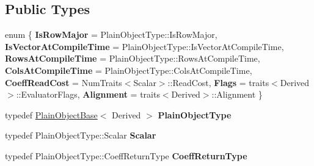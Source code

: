 \subsection*{Public Types}
\begin{DoxyCompactItemize}
\item 
\mbox{\label{struct_eigen_1_1internal_1_1evaluator_3_01_plain_object_base_3_01_derived_01_4_01_4_a65855b20686122463948b63ef277e050}} 
enum \{ \newline
{\bfseries Is\+Row\+Major} = Plain\+Object\+Type\+::Is\+Row\+Major, 
{\bfseries Is\+Vector\+At\+Compile\+Time} = Plain\+Object\+Type\+::Is\+Vector\+At\+Compile\+Time, 
{\bfseries Rows\+At\+Compile\+Time} = Plain\+Object\+Type\+::Rows\+At\+Compile\+Time, 
{\bfseries Cols\+At\+Compile\+Time} = Plain\+Object\+Type\+::Cols\+At\+Compile\+Time, 
\newline
{\bfseries Coeff\+Read\+Cost} = Num\+Traits$<$Scalar$>$\+::Read\+Cost, 
{\bfseries Flags} = traits$<$Derived$>$\+::Evaluator\+Flags, 
{\bfseries Alignment} = traits$<$Derived$>$\+::Alignment
 \}
\item 
\mbox{\label{struct_eigen_1_1internal_1_1evaluator_3_01_plain_object_base_3_01_derived_01_4_01_4_a76a6d1a9b3268d7aa837046092882c57}} 
typedef \mbox{\hyperlink{class_eigen_1_1_plain_object_base}{Plain\+Object\+Base}}$<$ Derived $>$ {\bfseries Plain\+Object\+Type}
\item 
\mbox{\label{struct_eigen_1_1internal_1_1evaluator_3_01_plain_object_base_3_01_derived_01_4_01_4_a8b241e19d470cc7104de570d4bd4f39b}} 
typedef Plain\+Object\+Type\+::\+Scalar {\bfseries Scalar}
\item 
\mbox{\label{struct_eigen_1_1internal_1_1evaluator_3_01_plain_object_base_3_01_derived_01_4_01_4_a4fce2c577a4086d1e211c58e1a4805ec}} 
typedef Plain\+Object\+Type\+::\+Coeff\+Return\+Type {\bfseries Coeff\+Return\+Type}
\end{DoxyCompactItemize}
